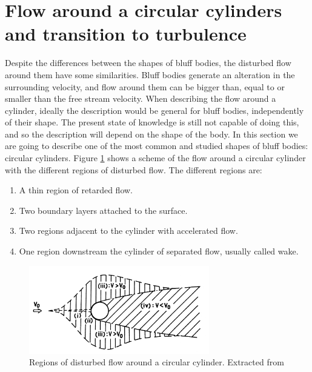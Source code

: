 \documentclass[journal]{new-aiaa}
\begin{document}
\clearpage

\section{Flow around a circular cylinders and transition to turbulence}

Despite the differences between the shapes of bluff bodies, the disturbed flow around them have some similarities. Bluff bodies generate an alteration in the surrounding velocity, and flow around them can be bigger than, equal to or smaller than the free stream velocity. When describing the flow around a cylinder, ideally  the description would be general for bluff bodies, independently of their shape. The present state of knowledge is still not capable of doing this, and so the description will depend on the shape of the body. In this section we are going to describe one of the most common and studied shapes of bluff bodies: circular cylinders. Figure \ref{fig:RegionsFlow} shows a scheme of the flow around a circular cylinder with the different regions of disturbed flow. The different regions are:

\begin{enumerate}[label=(\roman*)]
\item A thin region of retarded flow.
\item Two boundary layers attached to the surface.
\item Two regions adjacent to the cylinder with accelerated flow.
\item One region downstream the cylinder of separated flow, usually called wake.
\end{enumerate}

\begin{figure}[H]
\begin{center}
\includegraphics[width=0.7\textwidth]{Images/federico/Figure01}
\caption{ Regions of disturbed flow around a circular cylinder. Extracted from \cite{Zdravkovich1997} }
\label{fig:RegionsFlow}
\end{center}
\end{figure}
\end{document}

